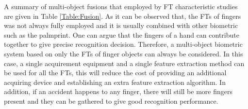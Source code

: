 \documentclass[review]{elsarticle}
\begin{document}
	A summary of multi-object fusions that employed by FT characteristic studies are given in Table \ref{Table:Fusion}. As it can be observed that, the FTs of fingers was not always fully employed and it is usually combined with other biometric such as the palmprint. One can argue that the fingers of a hand can contribute together to give precise recognition decision. Therefore, a multi-object biometric system based on only the FTs of finger objects can always be considered. In this case, a single acquirement equipment and a single feature extraction method can be used for all the FTs, this will reduce the cost of providing an additional acquiring device and establishing an extra feature extraction algorithm. In addition, if an accident happens to any finger, there will still be more fingers present and they can be gathered to give good recognition performance. 
\end{document}
